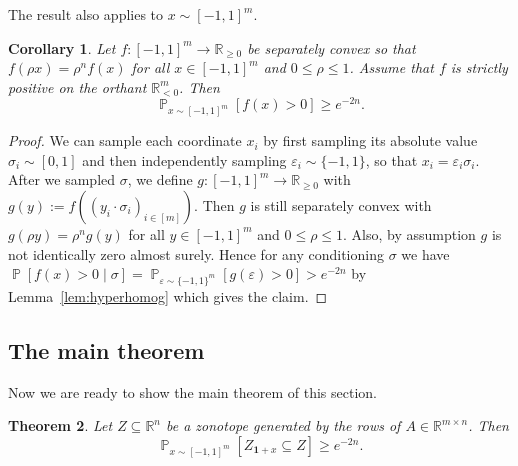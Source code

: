 \documentclass[12pt,english]{article}
\theoremstyle{theorem}
\newtheorem{theorem}{Theorem}
\newtheorem{corollary}[theorem]{Corollary}
\theoremstyle{remark}
\providecommand{\setR}{\mathbb{R}}
\renewcommand{\Pr}{\mathop{\mathbb{P}}}
\begin{document}
The result also applies to $x \sim [-1,1]^m$.
\begin{corollary}\label{cor:hyperhomogCont}
  Let $f : [-1,1]^m \to \mathbb{R}_{\ge 0}$ be separately convex so that $f(\rho x) = \rho^n f(x)$ for all $x \in [-1,1]^m$ and $0 \leq \rho \leq 1$.
Assume that $f$ is strictly positive on the orthant $\setR_{<0}^m$.
Then
\[ \Pr_{x \sim [-1,1]^m } [f(x) > 0] \ge e^{-2n}. \]
\end{corollary}
\begin{proof}
  We can sample each coordinate $x_i$ by first sampling its absolute value $\sigma_i \sim [0,1]$ and then independently sampling $\varepsilon_i \sim \{-1,1\}$, so that $x_i=\varepsilon_i \sigma_i$. After we sampled
  $\sigma$, we define $g : [-1,1]^m \to \setR_{\geq 0}$ with $g(y) := f( (y_i \cdot \sigma_i)_{i \in [m]})$. Then $g$ is still separately convex with $g(\rho y) = \rho^n g(y)$ for all $y \in [-1,1]^m$ and $0 \leq \rho \leq 1$. Also, by assumption $g$ is not identically zero almost surely.
  Hence for any conditioning $\sigma$ we have $\Pr[f(x) > 0 \mid \sigma] = \Pr_{\varepsilon \sim \{ -1,1\}^m}[g(\varepsilon) > 0] > e^{-2n}$ by Lemma~\ref{lem:hyperhomog} which gives the claim.
\end{proof}

\subsection{The main theorem}

Now we are ready to show the main theorem of this section.



\begin{theorem} \label{thm:UniformRandomZonotopeInclusion}
  Let $Z \subseteq \setR^n$ be a zonotope generated by the rows of $A \in \setR^{m \times n}$.  Then
  \[
    \Pr_{x \sim [-1,1]^m}[Z_{\bm{1}+x} \subseteq Z] \geq e^{-2n}.
  \]
\end{theorem}
\end{document}
